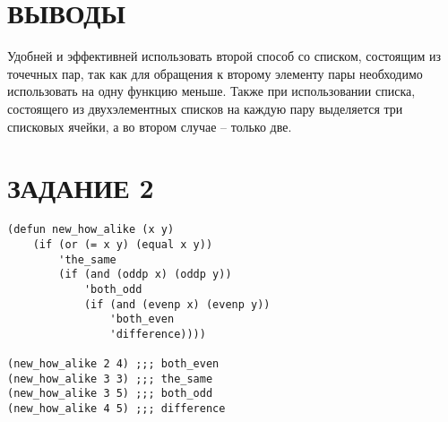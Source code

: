 \section{ВЫВОДЫ}

Удобней и эффективней использовать второй способ со списком,
состоящим из точечных пар, так как для обращения к второму
элементу пары необходимо использовать на одну функцию меньше.
Также при использовании списка, состоящего из двухэлементных списков
на каждую пару выделяется три списковых ячейки, а во втором случае --
только две.

\section{ЗАДАНИЕ 2}

\begin{lstlisting}
(defun new_how_alike (x y)
    (if (or (= x y) (equal x y))
        'the_same
        (if (and (oddp x) (oddp y))
            'both_odd
            (if (and (evenp x) (evenp y))
                'both_even
                'difference))))

(new_how_alike 2 4) ;;; both_even
(new_how_alike 3 3) ;;; the_same
(new_how_alike 3 5) ;;; both_odd
(new_how_alike 4 5) ;;; difference
\end{lstlisting}
